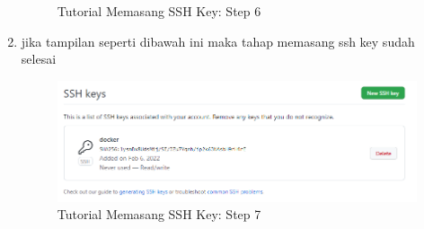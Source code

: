 \begin{enumerate}
\begin{figure}[H]
        \caption{Tutorial Memasang SSH Key: Step 6}
\end{figure}
\item jika tampilan seperti dibawah ini maka tahap memasang ssh key sudah selesai
\begin{figure}[H]
        \centerline{\includegraphics[scale=0.5]{figures/memasang-ssh-key/step7}}
        \caption{Tutorial Memasang SSH Key: Step 7}
\end{figure}
\end{enumerate}
